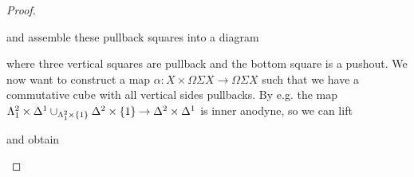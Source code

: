 \begin{lemma}
\begin{proof}
        \begin{center}
        \end{center}
        and assemble these pullback squares into a diagram
        \begin{center}
        \end{center}
        where three vertical squares are pullback and the bottom square is a pushout.
        We now want to construct a map $\alpha\colon X\times\Omega\Sigma X\to\Omega\Sigma X$ such that we have a commutative cube with all vertical sides pullbacks.
        By e.g. \cite[Lemma 1.4.7.5]{kerodon} the map $\Lambda_1^2\times\Delta^1\cup_{\Lambda_1^2\times\left\lbrace1\right\rbrace}\Delta^2\times\left\lbrace1
        \right\rbrace\to\Delta^2\times\Delta^1$ is inner anodyne, so we can lift
        \begin{center}
        \end{center}
        and obtain 
        \begin{center}
\end{center}
\end{proof}
\end{lemma}
